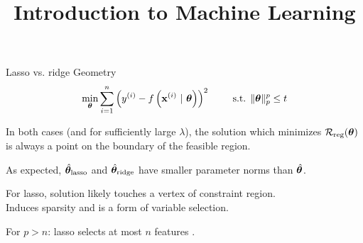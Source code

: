 \documentclass[11pt,compress,t,notes=noshow, xcolor=table]{beamer}
\title{Introduction to Machine Learning}
\begin{document}


\begin{vbframe}{Lasso vs. ridge Geometry}
$$ 
  \min_{\bm{\theta}} \sum\limits_{i=1}^n \left(y^{(i)} - f\left(\mathbf{x}^{(i)} ~|~ \bm{\theta}\right)\right)^2 \qquad \text{ s.t. } \|\bm{\theta}\|_p^p  \leq t 
$$ 
  \vspace{-0.5cm}
  \begin{figure}
    \centering
  \end{figure}

  \begin{itemize}
    \item \small{In both cases (and for sufficiently large $\lambda$), the solution which minimizes $\mathcal{R}_{\text{reg}}(\bm{\theta})$ is always a point on the boundary of the feasible region.
    \item As expected, $\hat{\bm{\theta}}_{\text{lasso}}$ and $\hat{\bm{\theta}}_{\text{ridge}}$ have smaller parameter norms than $\hat{\bm{\theta}}$.}
    \item For lasso, solution likely touches a vertex of constraint region. \\
        Induces sparsity and is a form of variable selection.
    \item For $p>n$: lasso selects at most $n$ features .
    
  \end{itemize}
  
\end{vbframe}
\end{document}
